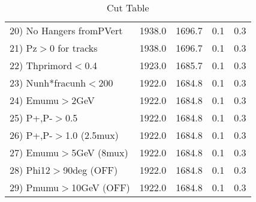 \begin{table}[h!]
\begin{tabular}{||l||r|r|r|r||}
 20) No Hangers fromPVert &      1938.0 &      1696.7 &         0.1 &         0.3 \\
 21) Pz$>$0 for tracks    &      1938.0 &      1696.7 &         0.1 &         0.3 \\
 22) Thprimord$<$0.4      &      1923.0 &      1685.7 &         0.1 &         0.3 \\
 23) Nunh*fracunh$<$200   &      1922.0 &      1684.8 &         0.1 &         0.3 \\
 24) Emumu$>$2GeV         &      1922.0 &      1684.8 &         0.1 &         0.3 \\
 25) P+,P-$>$0.5          &      1922.0 &      1684.8 &         0.1 &         0.3 \\
 26) P+,P-$>$1.0 (2.5mux) &      1922.0 &      1684.8 &         0.1 &         0.3 \\
 27) Emumu$>$5GeV  (8mux) &      1922.0 &      1684.8 &         0.1 &         0.3 \\
 28) Phi12$>$90deg  (OFF) &      1922.0 &      1684.8 &         0.1 &         0.3 \\
 29) Pmumu$>$10GeV  (OFF) &      1922.0 &      1684.8 &         0.1 &         0.3 \\
 \hline
 \hline
 \end{tabular}
 \caption{Cut Table \cohjp  }
 \label{tab-cut__jpsi}
 \end{table}
